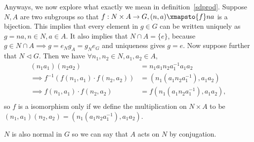 Anyways, we now explore what exactly we mean in
definition~\ref{sdprod}. Suppose $N, A$ are two subgroups so that $f : N
\times A \to G, (n, a) \xmapsto{f} na$ is a bijection. This implies that
every element in $g \in G$ can be written uniquely as $g = na, n \in N,
a \in A$.  It also implies that $N \cap A = \lbrace e \rbrace$, because
$g \in N \cap A \implies g = e_N g_A = g_N e_G$ and uniqueness gives $g
= e$. Now suppose further that $N \lhd G$. Then we have $\forall n_1,
n_2 \in N, a_1, a_2 \in A$,
\[ \begin{aligned}
(n_1 a_1)(n_2 a_2) &= n_1 a_1 n_2 a_1^{-1} a_1 a_2 \\
\implies f^{-1}(f(n_1, a_1) \cdot f(n_2, a_2)) &= (n_1 (a_1 n_2
a_1^{-1}), a_1 a_2) \\
\implies f(n_1, a_1) \cdot f(n_2, a_2) &= f(n_1 (a_1 n_2 a_1^{-1}), a_1
a_2), \\
\end{aligned} \]
so $f$ is a isomorphism only if we define the multiplication on $N
\times A$ to be $(n_1, a_1)(n_2, a_2) = (n_1 (a_1 n_2 a_1^{-1}), a_1
a_2)$.

$N$ is also normal in $G$ so we can say that $A$ acts on $N$ by
conjugation.
